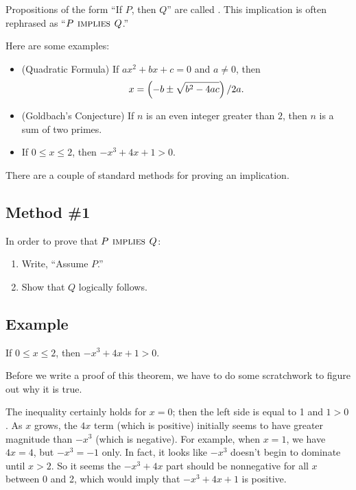 Propositions of the form ``If $P$, then $Q$'' are called
.  This implication is often rephrased as ``$P
\mathbin{\mathrm{\textsc{\,implies\,}}} Q$.''

Here are some examples:
%
\begin{itemize}

\item (Quadratic Formula) If $a x^2 + b x + c = 0$ and $a \neq 0$,
then
\[
x = \left(- b \pm \sqrt{b^2 - 4 a c}\right) / 2a.
\]

\item (Goldbach's Conjecture) If $n$ is an even integer greater than
$2$, then $n$ is a sum of two primes.

\item If $0 \leq x \leq 2$, then $-x^3 + 4x + 1 > 0$.

\end{itemize}
%
There are a couple of standard methods for proving an implication.

\subsection{Method \#1}

In order to prove that $P \mathbin{\mathrm{\textsc{\,implies\,}}} Q$:
%
\begin{enumerate}
\item Write, ``Assume $P$.''
\item Show that $Q$ logically follows.
\end{enumerate}

\subsection*{Example}

\begin{theorem}
If $0 \leq x \leq 2$, then $-x^3 + 4x + 1 > 0$.
\end{theorem}

Before we write a proof of this theorem, we have to do some
scratchwork to figure out why it is true.

The inequality certainly holds for $x = 0$; then the left side is
equal to 1 and $1 > 0$.  As $x$ grows, the $4x$ term (which is
positive) initially seems to have greater magnitude than $-x^3$ (which
is negative).  For example, when $x = 1$, we have $4x = 4$, but $-x^3
= -1$ only.  In fact, it looks like $-x^3$ doesn't begin to dominate
until $x > 2$.  So it seems the $-x^3 + 4x$ part should be nonnegative
for all $x$ between 0 and 2, which would imply that $-x^3 + 4x + 1$ is
positive.

